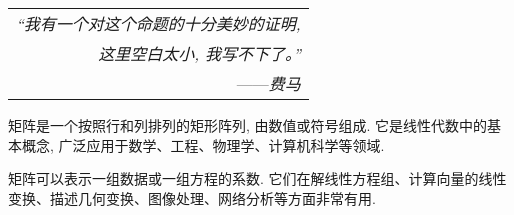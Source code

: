 \begin{flushright}
    \begin{tabular}{r||}
        \textit{“我有一个对这个命题的十分美妙的证明, }\\
        \textit{这里空白太小, 我写不下了。”}\\
        ——\textit{费马}
    \end{tabular}
\end{flushright}

矩阵是一个按照行和列排列的矩形阵列, 由数值或符号组成. 它是线性代数中的基本概念, 广泛应用于数学、工程、物理学、计算机科学等领域. 

矩阵可以表示一组数据或一组方程的系数. 它们在解线性方程组、计算向量的线性变换、描述几何变换、图像处理、网络分析等方面非常有用. 
